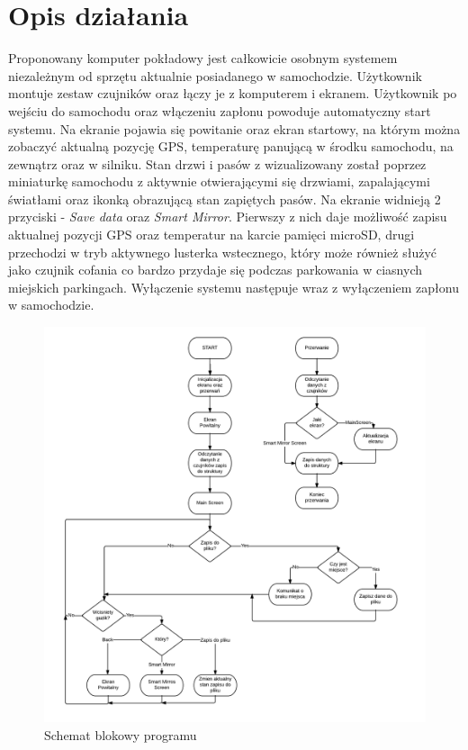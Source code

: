 \documentclass{xmgr}
\begin{document}
\section{Opis działania}
Proponowany komputer pokładowy jest całkowicie osobnym systemem niezależnym od sprzętu aktualnie posiadanego w samochodzie. Użytkownik montuje zestaw czujników oraz łączy je z komputerem i ekranem. Użytkownik po wejściu do samochodu oraz włączeniu zapłonu powoduje automatyczny start systemu. Na ekranie pojawia się powitanie oraz ekran startowy, na którym można zobaczyć aktualną pozycję GPS, temperaturę panującą w środku samochodu, na zewnątrz oraz w silniku. Stan drzwi i pasów z wizualizowany został poprzez miniaturkę samochodu z aktywnie otwierającymi się drzwiami, zapalającymi światłami oraz ikonką obrazującą stan zapiętych pasów. Na ekranie widnieją 2 przyciski - \emph{Save data} oraz \emph{Smart Mirror}. Pierwszy z nich daje możliwość zapisu aktualnej pozycji GPS oraz temperatur na karcie pamięci microSD, drugi przechodzi w tryb aktywnego lusterka wstecznego, który może również służyć jako czujnik cofania co bardzo przydaje się podczas parkowania w ciasnych miejskich parkingach. Wyłączenie systemu następuje wraz z wyłączeniem zapłonu w samochodzie.

\begin{figure}[!hp]
    \centering
    	\includegraphics[height=0.7\textheight]{images/codeDiagram.png}
    \caption{Schemat blokowy programu}
\end{figure}
\end{document}
